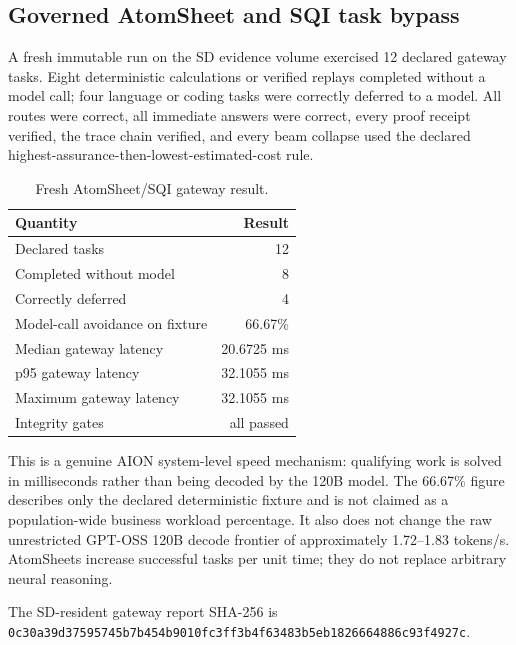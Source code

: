 \subsection{Governed AtomSheet and SQI task bypass}

A fresh immutable run on the SD evidence volume exercised 12 declared gateway
tasks.  Eight deterministic calculations or verified replays completed without
a model call; four language or coding tasks were correctly deferred to a model.
All routes were correct, all immediate answers were correct, every proof receipt
verified, the trace chain verified, and every beam collapse used the declared
highest-assurance-then-lowest-estimated-cost rule.

\begin{table}[ht]
\centering
\caption{Fresh AtomSheet/SQI gateway result.}
\begin{tabular}{@{}lr@{}}
\toprule
Quantity & Result \\
\midrule
Declared tasks & 12 \\
Completed without model & 8 \\
Correctly deferred & 4 \\
Model-call avoidance on fixture & 66.67\% \\
Median gateway latency & 20.6725 ms \\
p95 gateway latency & 32.1055 ms \\
Maximum gateway latency & 32.1055 ms \\
Integrity gates & all passed \\
\bottomrule
\end{tabular}
\end{table}

This is a genuine AION system-level speed mechanism: qualifying work is solved
in milliseconds rather than being decoded by the 120B model.  The 66.67\%
figure describes only the declared deterministic fixture and is not claimed as
a population-wide business workload percentage.  It also does not change the
raw unrestricted GPT-OSS 120B decode frontier of approximately 1.72--1.83
tokens/s.  AtomSheets increase successful tasks per unit time; they do not
replace arbitrary neural reasoning.

The SD-resident gateway report SHA-256 is
\texttt{0c30a39d37595745b7b454b9010fc3ff3b4f63483b5eb1826664886c93f4927c}.
